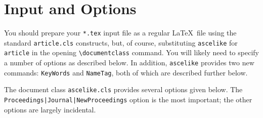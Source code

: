 \documentclass[Proceedings]{ascelike}
\begin{document}
\section{Input and Options}
You should
prepare your \verb+*.tex+ input file as a regular
\LaTeX\ file using the standard \texttt{article.cls} constructs,
but, of course, substituting \texttt{ascelike} for \texttt{article}
in the opening \verb+\documentclass+ command.
You will likely need to specify a number of options as described below.
In addition, \texttt{ascelike} provides two new commands: \verb+KeyWords+ and
\verb+NameTag+, both of which are described further below.
\par
The document class \texttt{ascelike.cls} provides several options given
below.
The \verb+Proceedings|+\-\verb+Journal|+\-\verb+NewProceedings+ 
option is the most important;
the other options are largely incidental.
%
\end{document}
